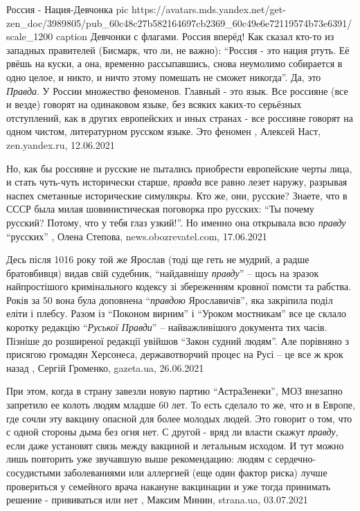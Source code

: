 Россия - Нация-Девчонка
\ifcmt
	pic https://avatars.mds.yandex.net/get-zen_doc/3989805/pub_60c48c27b582164697cb2369_60c49e6e72119574b73e6391/scale_1200
  caption Девчонки с флагами. Россия вперёд!
\fi
Как сказал кто-то из западных правителей (Бисмарк, что ли, не важно):
\enquote{Россия - это нация ртуть. Её рвёшь на куски, а она, временно
рассыпавшись, снова неумолимо собирается в одно целое, и никто, и ничто этому
помешать не сможет никогда}. Да, это \emph{Правда}. У России множество
феноменов. Главный - это язык.  Все россияне (все и везде) говорят на
одинаковом языке, без всяких каких-то серьёзных отступлений, как в других
европейских и иных странах - все россияне говорят на одном чистом,
литературном русском языке. Это феномен
, 
Алексей Наст, zen.yandex.ru, 12.06.2021

Но, как бы россияне и русские не пытались приобрести европейские черты лица, и
стать чуть-чуть исторически старше, \emph{правда} все равно лезет наружу, разрывая
наспех сметанные исторические симулякры.  Кто же, они, русские?  Знаете, что в
СССР была милая шовинистическая поговорка про русских: \enquote{Ты почему русский?
Потому, что у тебя глаз узкий!}. Но именно она открывала всю \emph{правду} \enquote{русских}
, 
Олена Степова, news.obozrevatel.com, 17.06.2021


Десь після 1016 року той же Ярослав (тоді ще геть не мудрий, а радше
братовбивця) видав свій судебник, \enquote{найдавнішу \emph{правду}} – щось на зразок
найпростішого кримінального кодексу зі збереженням кровної помсти та рабства.
Років за 50 вона була доповнена \enquote{\emph{правдою} Ярославичів}, яка закріпила поділ
еліти і плебсу. Разом із \enquote{Поконом вирним} і \enquote{Уроком мостникам} все це склало
коротку редакцію \enquote{\emph{Руської Правди}} – найважливішого документа тих часів. Пізніше
до розширеної редакції увійшов \enquote{Закон судний людям}.  Але порівняно з присягою
громадян Херсонеса, державотворчий процес на Русі – це все ж крок назад
, 
Сергій Громенко, gazeta.ua, 26.06.2021

При этом, когда в страну завезли новую партию \enquote{АстраЗенеки}, МОЗ
внезапно запретило ее колоть людям младше 60 лет. То есть сделало то же, что и
в Европе, где сочли эту вакцину опасной для более молодых людей.  Это говорит о
том, что с одной стороны дыма без огня нет. С другой - вряд ли власти скажут
\emph{правду}, если даже установят связь между вакциной и летальным исходом.  И
тут можно лишь повторить уже звучавшую выше рекомендацию: людям с
сердечно-сосудистыми заболеваниями или аллергией (еще один фактор риска) лучше
провериться у семейного врача накануне вакцинации и уже тогда принимать решение
- прививаться или нет
, 
Максим Минин, strana.ua, 03.07.2021

